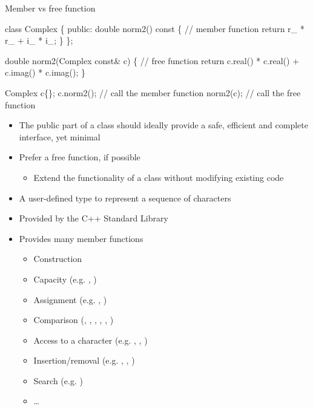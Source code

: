 \begin{frame}[fragile]{Member vs free function}
  \begin{codeblock}
class Complex \{
 public:
  double norm2() const \{ // \alert<1>{member function}
    return r_ * r_ + i_ * i_;
  \}
  \ddd
\};

double norm2(Complex const& c) \{ // \alert<1>{free function}
  return c.real() * c.real() + c.imag() * c.imag();
\}

Complex c\{\ddd\};
c.norm2(); // call the member function
norm2(c);  // call the free function\end{codeblock}

  \pause
  \begin{itemize}
  \item The public part of a class should ideally provide a safe, efficient and
    complete interface, yet minimal
  \item Prefer a free function, if possible
    \begin{itemize}
    \item Extend the functionality of a class without modifying existing code
    \end{itemize}
  \end{itemize}

\end{frame}

\begin{frame}[fragile]{ \insertcontinuationtext}

  \begin{itemize}

  \item A user-defined type to represent a sequence of characters
  \item Provided by the C++ Standard Library
  \item Provides many member functions
    \begin{itemize}
    \item Construction
    \item Capacity (e.g. , )
    \item Assignment (e.g. \code{=}, )
    \item Comparison (\code{==}, \code{!=}, \code{<}, \code{>}, \code{<=}, \code{>=})
    \item Access to a character (e.g. \code{[]}, , )
    \item Insertion/removal (e.g. , , )
    \item Search (e.g. )
    \item \ldots
    \end{itemize}
  \end{itemize}

\end{frame}

